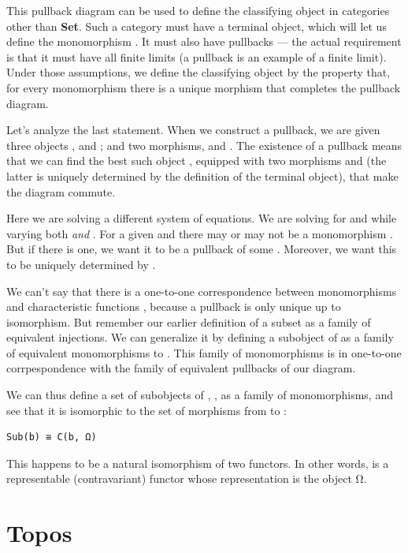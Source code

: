 This pullback diagram can be used to define the classifying object in
categories other than \textbf{Set}. Such a category must have a terminal
object, which will let us define the monomorphism . It must
also have pullbacks --- the actual requirement is that it must have all
finite limits (a pullback is an example of a finite limit). Under those
assumptions, we define the classifying object  by the property
that, for every monomorphism  there is a unique morphism
 that completes the pullback diagram.

Let's analyze the last statement. When we construct a pullback, we are
given three objects ,  and ; and two
morphisms,  and . The existence of a pullback
means that we can find the best such object , equipped with
two morphisms  and  (the latter is uniquely
determined by the definition of the terminal object), that make the
diagram commute.

Here we are solving a different system of equations. We are solving for
 and  while varying both  \emph{and}
. For a given  and  there may or may not
be a monomorphism . But if there is one, we
want it to be a pullback of some . Moreover, we want this
 to be uniquely determined by .

We can't say that there is a one-to-one correspondence between
monomorphisms  and characteristic functions ,
because a pullback is only unique up to isomorphism. But remember our
earlier definition of a subset as a family of equivalent injections. We
can generalize it by defining a subobject of  as a family of
equivalent monomorphisms to . This family of monomorphisms is
in one-to-one corrpespondence with the family of equivalent pullbacks of
our diagram.

We can thus define a set of subobjects of , ,
as a family of monomorphisms, and see that it is isomorphic to the set
of morphisms from  to :

\begin{verbatim}
Sub(b) ≅ C(b, Ω)
\end{verbatim}

This happens to be a natural isomorphism of two functors. In other
words,  is a representable (contravariant) functor whose
representation is the object Ω.

\section{Topos}\label{topos}

